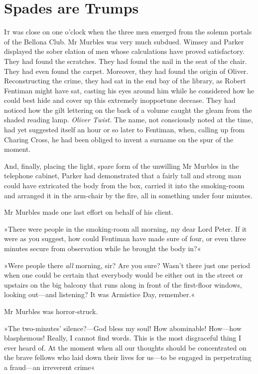 \chapter{Spades are Trumps}
\lettrine[lines=4]{I}{t} was close on one o'clock when the three men emerged from the solemn portals of the Bellona Club. Mr Murbles was very much subdued. Wimsey and Parker displayed the sober elation of men whose calculations have proved satisfactory. They had found the scratches. They had found the nail in the seat of the chair. They had even found the carpet. Moreover, they had found the origin of Oliver. Reconstructing the crime, they had sat in the end bay of the library, as Robert Fentiman might have sat, casting his eyes around him while he considered how he could best hide and cover up this extremely inopportune decease. They had noticed how the gilt lettering on the back of a volume caught the gleam from the shaded reading lamp. \textit{Oliver Twist.} The name, not consciously noted at the time, had yet suggested itself an hour or so later to Fentiman, when, calling up from Charing Cross, he had been obliged to invent a surname on the spur of the moment.

And, finally, placing the light, spare form of the unwilling Mr Murbles in the telephone cabinet, Parker had demonstrated that a fairly tall and strong man could have extricated the body from the box, carried it into the smoking-room and arranged it in the arm-chair by the fire, all in something under four minutes.

Mr Murbles made one last effort on behalf of his client.

»There were people in the smoking-room all morning, my dear Lord Peter. If it were as you suggest, how could Fentiman have made sure of four, or even three minutes secure from observation while he brought the body in?«

»Were people there \textit{all} morning, sir? Are you sure? Wasn't there just one period when one could be certain that everybody would be either out in the street or upstairs on the big balcony that runs along in front of the first-floor windows, looking out—and listening? It was Armistice Day, remember.«

Mr Murbles was horror-struck.

»The two-minutes' silence?—God bless my soul! How abominable! How—how blasphemous! Really, I cannot find words. This is the most disgraceful thing I ever heard of. At the moment when all our thoughts should be concentrated on the brave fellows who laid down their lives for us—to be engaged in perpetrating a fraud—an irreverent crime\longdash«

